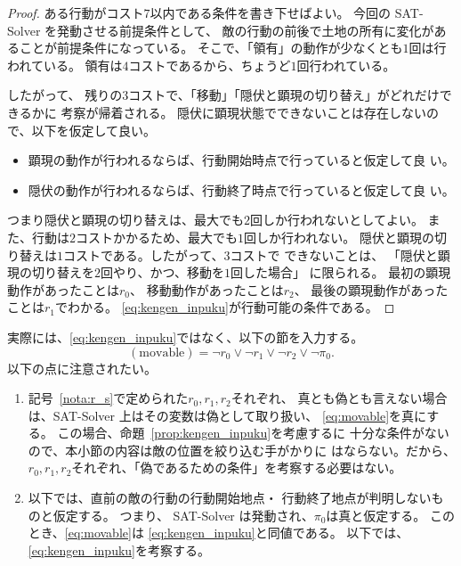 \begin{proof}
 ある行動がコスト$7$以内である条件を書き下せばよい。
 今回の SAT-Solver を発動させる前提条件として、
 敵の行動の前後で土地の所有に変化があることが前提条件になっている。
 そこで、「領有」の動作が少なくとも$1$回は行われている。
 領有は$4$コストであるから、ちょうど$1$回行われている。

 したがって、
 残りの$3$コストで、「移動」「隠伏と顕現の切り替え」がどれだけできるかに
 考察が帰着される。 
 隠伏に顕現状態でできないことは存在しないので、以下を仮定して良い。
 \begin{itemize}
  \item 顕現の動作が行われるならば、行動開始時点で行っていると仮定して良
        い。
  \item 隠伏の動作が行われるならば、行動終了時点で行っていると仮定して良
        い。
 \end{itemize} 
 つまり隠伏と顕現の切り替えは、最大でも$2$回しか行われないとしてよい。
 また、行動は$2$コストかかるため、最大でも$1$回しか行われない。
 隠伏と顕現の切り替えは$1$コストである。したがって、$3$コストで
 できないことは、
 「隠伏と顕現の切り替えを$2$回やり、かつ、移動を$1$回した場合」
 に限られる。
 最初の顕現動作があったことは$r_0$、
 移動動作があったことは$r_2$、
 最後の顕現動作があったことは$r_1$でわかる。
 \eqref{eq:kengen_inpuku}が行動可能の条件である。\qedhere
\end{proof}

\begin{rem} \label{rem:kengen_inpuku_omit}
 実際には、\eqref{eq:kengen_inpuku}ではなく、以下の節を入力する。
 \begin{equation}
  (\text{movable}) = \lnot r_0 \lor \lnot r_1 \lor \lnot r_2 \lor \lnot \pi_0.
   \label{eq:movable}
 \end{equation}
 以下の点に注意されたい。
 \begin{enumerate}[1.] \sage
  \item 記号~\ref{nota:r_s}で定められた$r_0, r_1, r_2$それぞれ、
        真とも偽とも言えない場合は、SAT-Solver 上はその変数は偽として取り扱い、
        \eqref{eq:movable}を真にする。
        この場合、命題~\ref{prop:kengen_inpuku}を考慮するに
        十分な条件がないので、本小節の内容は敵の位置を絞り込む手がかりに
        はならない。だから、
        $r_0, r_1, r_2$それぞれ、「偽であるための条件」を考察する必要はない。
  \item 以下では、直前の敵の行動の行動開始地点・
        行動終了地点が判明しないものと仮定する。
        つまり、 SAT-Solver は発動され、$\pi_0$は真と仮定する。
        このとき、\eqref{eq:movable}は
        \eqref{eq:kengen_inpuku}と同値である。
        以下では、\eqref{eq:kengen_inpuku}を考察する。
 \end{enumerate}
\end{rem}

